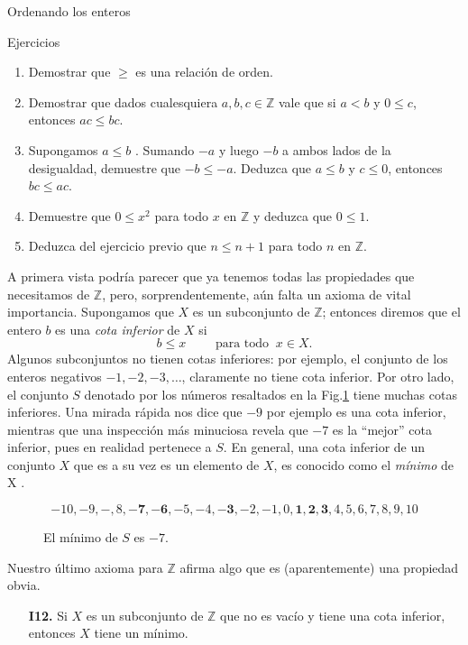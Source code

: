 \documentclass[11pt,spanish,makeidx]{amsbook}
\theoremstyle{definition}
\theoremstyle{remark}
\begin{document}
\begin{section}{Ordenando los enteros}
\begin{subsection}{Ejercicios}\label{ejerciciosorden}
\begin{enumerate}
\item Demostrar que $\ge$ es una relación de orden.
\item Demostrar que dados cualesquiera $a,b,c \in \mathbb Z$ vale que si $a< b$ y $0\le c$, entonces $ac \le bc$. 
\item Supongamos $a\le b$ . Sumando $-a$ y luego $-b$ a ambos lados de la desigualdad, demuestre que $-b\le -a$. Deduzca que $a\le b$ y $c\le 0$, entonces $bc \le ac$.
\item Demuestre que $0\le x^2$ para todo $x$ en $\mathbb Z$ y deduzca que $0 \le 1$.
\item Deduzca del ejercicio previo que $n \le n+1$ para todo $n$ en
$\mathbb Z$.
\end{enumerate}
\end{subsection}

A primera vista podría parecer que ya tenemos todas las propiedades que necesitamos de $\mathbb Z$, pero, sorprendentemente, aún falta un axioma de vital importancia. Supongamos que $X$ es un subconjunto de $\mathbb Z$; entonces diremos que el entero $b$ es una {\em cota inferior} de $X$ si
$$
b\le x \qquad \text{ para todo } \ x \in X.
$$
Algunos subconjuntos no tienen cotas inferiores: por ejemplo, el conjunto de los enteros negativos $-1,-2,-3,\ldots$, claramente no tiene cota inferior. Por otro lado, el conjunto $S$ denotado por los números resaltados en la Fig.\ref{f1.1} tiene muchas cotas inferiores. Una mirada rápida nos dice que $-9$ por ejemplo es una cota inferior, mientras que una inspección más minuciosa revela que $-7$ es la ``mejor'' cota inferior, pues en realidad pertenece a $S$. En general, una cota inferior de un conjunto $X$ que es a su vez es un elemento de $X$, es conocido como el {\em mínimo} de X .


\begin{figure}[ht]
$$
-10,-9,-,8,\mathbf{-7},\mathbf{-6},-5,-4,\mathbf{-3},-2,-1,0,\mathbf{1},\mathbf{2},\mathbf{3}, 4,5,6,7,8,9,10
$$
\caption{El mínimo de $S$ es $-7$.}\label{f1.1}
\end{figure}

Nuestro último axioma para $\mathbb Z$ afirma algo que es (aparentemente) una propiedad obvia.

\begin{enumerate}
\item[{\bf I12.}] Si $X$ es un subconjunto de $\mathbb Z$ que no es vacío y tiene una cota inferior, entonces $X$ tiene un mínimo.
\end{enumerate}


\end{section}
\end{document}

